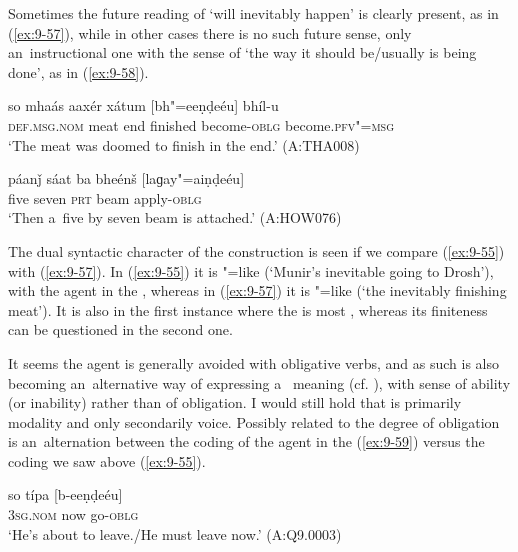 Sometimes the future reading of `will inevitably happen' is clearly present, as in (\ref{ex:9-57}), while in other cases there is no such future sense, only an~instructional one with the sense of `the way it should be/usually is being done', as in (\ref{ex:9-58}).

\begin{exe}
\ex
\label{ex:9-57}
\gll so mhaás aaxér xátum [bh"=eeṇḍeéu] bhíl-u \\
\textsc{def.msg.nom} meat end finished become-\textsc{oblg} become.\textsc{pfv"=msg}  \\
\glt `The meat was doomed to finish in the end.' (A:THA008)

\ex
\label{ex:9-58}
\gll páanǰ sáat ba bheénš [laɡay"=aiṇḍeéu] \\
five seven \textsc{prt} beam apply-\textsc{oblg} \\
\glt `Then a~five by seven beam is attached.' (A:HOW076)
\end{exe}

The dual syntactic character of the construction is seen if we compare (\ref{ex:9-55}) with (\ref{ex:9-57}). In (\ref{ex:9-55}) it is "=like (`Munir's inevitable going to Drosh'), with the agent in the , whereas in (\ref{ex:9-57}) it is "=like (`the inevitably finishing meat'). It is also in the first instance where the  is most , whereas its finiteness can be questioned in the second one.


It seems the agent is generally avoided with obligative  verbs, and as such is also becoming an~alternative way of expressing a~ meaning (cf. ), with sense of ability (or inability) rather than of obligation. I would still hold that  is primarily modality and only secondarily voice. Possibly related to the degree of obligation is an~alternation between the coding of the agent in the  (\ref{ex:9-59}) versus the  coding we saw above (\ref{ex:9-55}).

\begin{exe}
\ex
\label{ex:9-59}
\gll so típa [b-eeṇḍeéu] \\
\textsc{3sg.nom} now go-\textsc{oblg} \\
\glt `He's about to leave./He must leave now.' (A:Q9.0003)
\end{exe}

